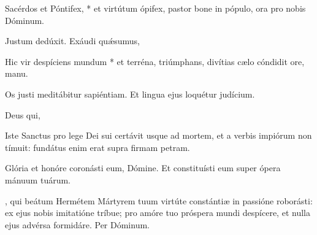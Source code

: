 \documentclass[fontsize=9pt,paper=A6,twoside,BCOR=1mm,DIV=22,headinclude]{scrarticle}
\renewcommand\A{\Ant}
\begin{document}
\begin{multicols}{2}
\A Sacérdos et Póntifex, * et virtútum ópifex, pastor bone in pópulo, ora pro nobis Dóminum.

\V Justum dedúxit.  Exáudi qu\'æsumus, 


\A Hic vir despíciens mundum * et terréna, triúmphans, divítias cælo cóndidit ore, manu.

\V Os justi meditábitur sapiéntiam.
\R Et lingua ejus loquétur judícium.

 Deus qui, 


\A Iste Sanctus pro lege Dei sui certávit usque ad mortem, et a verbis impiórum non tímuit: fundátus enim erat supra firmam petram.

\V Glória et honóre coronásti eum, Dómine.
\R Et constituísti eum super ópera mánuum tuárum.

\columnbreak
{}
, qui beátum Hermétem Mártyrem tuum virtúte constántiæ in passióne roborásti: ex ejus nobis imitatióne tríbue; pro amóre tuo próspera mundi despícere, et nulla ejus advérsa formidáre. Per Dóminum.

\end{multicols}

\ornamentvi
\end{document}
